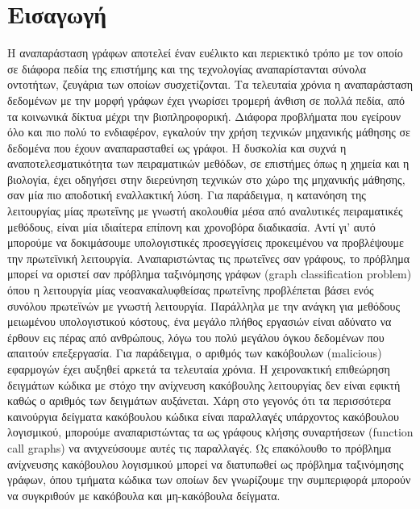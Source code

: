 \mainmatter
\chapter{Εισαγωγή}
\label{chap1}



Η αναπαράσταση γράφων αποτελεί έναν ευέλικτο και περιεκτικό τρόπο με τον οποίο σε διάφορα πεδία της επιστήμης και της τεχνολογίας αναπαρίστανται σύνολα οντοτήτων, ζευγάρια των οποίων συσχετίζονται.
Τα τελευταία χρόνια η αναπαράσταση δεδομένων με την μορφή γράφων έχει γνωρίσει τρομερή άνθιση σε πολλά πεδία, από τα κοινωνικά δίκτυα μέχρι την βιοπληροφορική.
Διάφορα προβλήματα που εγείρουν όλο και πιο πολύ το ενδιαφέρον, εγκαλούν την χρήση τεχνικών μηχανικής μάθησης σε δεδομένα που έχουν αναπαρασταθεί ως γράφοι.
Η δυσκολία και συχνά η αναποτελεσματικότητα των πειραματικών μεθόδων, σε επιστήμες όπως η χημεία και η βιολογία, έχει οδηγήσει στην διερεύνηση τεχνικών στο χώρο της μηχανικής μάθησης, σαν μία πιο αποδοτική εναλλακτική λύση. Για παράδειγμα, η κατανόηση της λειτουργίας μίας πρωτεΐνης με γνωστή ακολουθία μέσα από αναλυτικές πειραματικές μεθόδους, είναι μία ιδιαίτερα επίπονη και χρονοβόρα διαδικασία.
Αντί γι' αυτό μπορούμε να δοκιμάσουμε υπολογιστικές προσεγγίσεις προκειμένου να προβλέψουμε την πρωτεϊνική λειτουργία.
Αναπαριστώντας τις πρωτεΐνες σαν γράφους, το πρόβλημα μπορεί να οριστεί σαν πρόβλημα ταξινόμησης γράφων (graph classification problem) όπου η λειτουργία μίας νεοανακαλυφθείσας πρωτεΐνης προβλέπεται βάσει ενός συνόλου πρωτεϊνών με γνωστή λειτουργία. 
Παράλληλα με την ανάγκη για μεθόδους μειωμένου υπολογιστικού κόστους, ένα μεγάλο πλήθος εργασιών είναι αδύνατο να έρθουν εις πέρας από ανθρώπους, λόγω του πολύ μεγάλου όγκου δεδομένων που απαιτούν επεξεργασία.
Για παράδειγμα, ο αριθμός των κακόβουλων (malicious) εφαρμογών έχει αυξηθεί αρκετά τα τελευταία χρόνια.
Η χειρονακτική επιθεώρηση δειγμάτων κώδικα με στόχο την ανίχνευση κακόβουλης λειτουργίας δεν είναι εφικτή καθώς ο αριθμός των δειγμάτων αυξάνεται. 
Χάρη στο γεγονός ότι τα περισσότερα καινούργια δείγματα κακόβουλου κώδικα είναι παραλλαγές υπάρχοντος κακόβουλου λογισμικού, μπορούμε αναπαριστώντας τα ως γράφους κλήσης συναρτήσεων (function call graphs) να ανιχνεύσουμε αυτές τις παραλλαγές.
Ως επακόλουθο το πρόβλημα ανίχνευσης κακόβουλου λογισμικού μπορεί να διατυπωθεί ως πρόβλημα ταξινόμησης γράφων, όπου τμήματα κώδικα των οποίων δεν γνωρίζουμε την συμπεριφορά μπορούν να συγκριθούν με κακόβουλα και μη-κακόβουλα δείγματα. 

